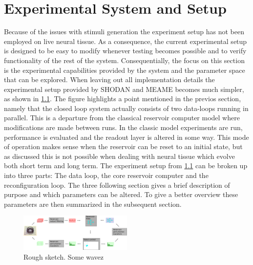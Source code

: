 \chapter{Experimental System and Setup}
Because of the issues with stimuli generation the experiment setup has not been
employed on live neural tissue.
As a consequence, the current experimental setup is designed to be easy to
modify whenever testing becomes possible and to verify functionality of the rest
of the system.
Consequentially, the focus on this section is the experimental capabilities
provided by the system and the parameter space that can be explored.
When leaving out all implementation details the experimental setup provided by
SHODAN and MEAME becomes much simpler, as shown in \ref{figExperimentLoop}.
The figure highlights a point mentioned in the previos section, namely that the
closed loop system actually consists of two data-loops running in parallel.
This is a departure from the classical reservoir computer model where
modifications are made between runs.
In the classic model experiments are run, performance is evaluated and the
readout layer is altered in some way.
This mode of operation makes sense when the reservoir can be reset to an initial
state, but as discussed this is not possible when dealing with neural tissue
which evolve both short term and long term.
The experiment setup from \ref{figExperimentLoop} can be broken up into three
parts: The data loop, the core reservoir computer and the reconfiguration loop.
The three following section gives a brief description of purpose and which
parameters can be altered.
To give a better overview these parameters are then summarized in the subsequent
section.
\begin{figure}[h!]
  \centering
  \includegraphics[width=0.5\textwidth]{fig/experimentLoop.png}
  \caption{Rough sketch.
    Some wavez
  }
  \label{figExperimentLoop}
\end{figure}
%
